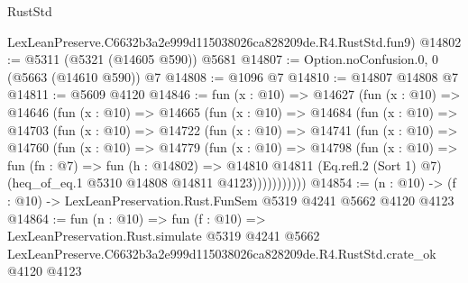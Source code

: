 \begin{lexlean}{RustStd}
\begin{coremodule}
    LexLeanPreserve.C6632b3a2e999d115038026ca828209de.R4.RustStd.fun9)
@14802 := @5311 (@5321 (@14605 @590)) @5681
@14807 := Option.noConfusion.{0, 0} (@5663 (@14610 @590)) @7
@14808 := @1096 @7
@14810 := @14807 @14808 @7
@14811 := @5609 @4120
@14846 := fun (x : @10) =>
  @14627
    (fun (x : @10) =>
    @14646
      (fun (x : @10) =>
      @14665
        (fun (x : @10) =>
        @14684
          (fun (x : @10) =>
          @14703
            (fun (x : @10) =>
            @14722
              (fun (x : @10) =>
              @14741
                (fun (x : @10) =>
                @14760
                  (fun (x : @10) =>
                  @14779
                    (fun (x : @10) =>
                    @14798
                      (fun (x : @10) =>
                      fun (fn : @7) =>
                      fun (h : @14802) =>
                      @14810
                        @14811
                        (Eq.refl.{2} (Sort 1) @7)
                        (heq_of_eq.{1} @5310 @14808 @14811 @4123)))))))))))
@14854 := (n : @10) -> (f : @10) -> LexLeanPreservation.Rust.FunSem @5319 @4241 @5662 @4120 @4123
@14864 := fun (n : @10) =>
  fun (f : @10) =>
  LexLeanPreservation.Rust.simulate
    @5319
    @4241
    @5662
    LexLeanPreserve.C6632b3a2e999d115038026ca828209de.R4.RustStd.crate_ok
    @4120
    @4123
\end{coremodule}
\end{lexlean}
